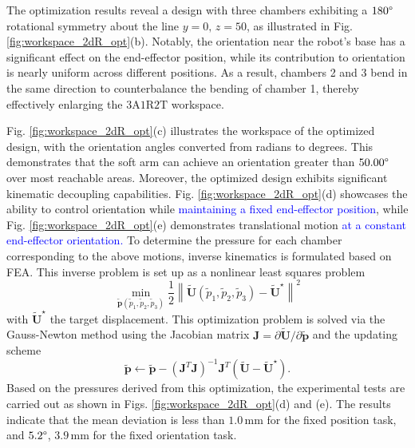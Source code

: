 \documentclass[journal]{IEEEtran}
\theoremstyle{definition}
\begin{document}
The optimization results reveal a design with three chambers exhibiting a $180\degree$ rotational symmetry about the line $y=0,\, z=50$, as illustrated in Fig. \ref{fig:workspace_2dR_opt}(b). Notably, the orientation near the robot's base has a significant effect on the end-effector position, while its contribution to orientation is nearly uniform across different positions. As a result, chambers 2 and 3 bend in the same direction to counterbalance the bending of chamber 1, thereby effectively enlarging the $3 \text{A} 1 \text{R} 2 \text{T}$ workspace.

Fig. \ref{fig:workspace_2dR_opt}(c) illustrates the workspace of the optimized design, with the orientation angles converted from radians to degrees. This demonstrates that the soft arm can achieve an orientation greater than $50.00\degree$ over most reachable areas. Moreover, the optimized design exhibits significant kinematic decoupling capabilities. Fig. \ref{fig:workspace_2dR_opt}(d) showcases the ability to control orientation while \textcolor{blue}{maintaining a fixed end-effector position}, while Fig. \ref{fig:workspace_2dR_opt}(e) demonstrates translational motion \textcolor{blue}{at a constant end-effector orientation.} To determine the pressure for each chamber corresponding to the above motions, inverse kinematics is formulated based on FEA. This inverse problem is set up as a nonlinear least squares problem
\begin{equation}
    \min_{\tilde{\mathbf{p}}(\tilde{p}_1, \tilde{p}_2, \tilde{p}_3)} \frac{1}{2}  \left\|\tilde{\mathbf{U}}(\tilde{p}_1, \tilde{p}_2, \tilde{p}_3) - \tilde{\mathbf{U}}^\star\right\|^2
\end{equation}
with $\tilde{\mathbf{U}}^\star$ the target displacement. This optimization problem is solved via the Gauss-Newton method using the Jacobian matrix
$
  \mathbf{J} = \partial \tilde{\mathbf{U}}/\partial \tilde{\mathbf{p}}
$
and the updating scheme
\begin{equation}
  \tilde{\mathbf{p}} \leftarrow \tilde{\mathbf{p}} - \left(\mathbf{J}^T \mathbf{J}\right)^{-1} \mathbf{J}^T \left(\tilde{\mathbf{U}} - \tilde{\mathbf{U}}^\star\right).
\end{equation}
Based on the pressures derived from this optimization, the experimental tests are carried out as shown in Figs. \ref{fig:workspace_2dR_opt}(d) and (e). The results indicate that the mean deviation is less than \(1.0 \, \text{mm}\) for the fixed position task, and \(5.2\degree\), \(3.9 \, \text{mm}\) for the fixed orientation task.
\end{document}
